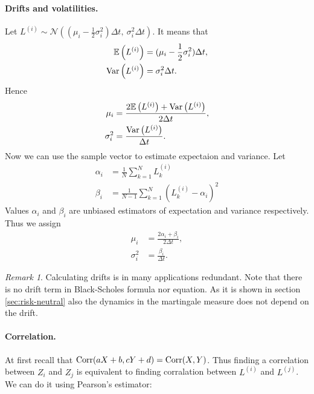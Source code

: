 \documentclass[a4paper,12pt, oneside]{book}
\theoremstyle{definition}
\theoremstyle{remark}
\newtheorem{remark}{Remark}[chapter]
\def\Var{{\rm Var}}
\def\E{{\mathbb{E}}}
\def\Corr{{\hbox{Corr}}}
\begin{document}
\paragraph{Drifts and volatilities.}
Let $L^{(i)} \sim \mathcal{N}\left(  (\mu_i - \frac{1}{2}\sigma_i^2)\Delta t,\ \sigma_i^2 \Delta t \right)$. It means that
\begin{equation*}
 \begin{split}
  \E\left( L^{(i)} \right) &= (\mu_i - \frac{1}{2}\sigma_i^2)\Delta t, \\
  \Var\left( L^{(i)} \right) &= \sigma_i^2 \Delta t.
 \end{split}
\end{equation*}
Hence
\begin{equation*}
 \begin{split}
  \mu_i  &= \frac{ 2\E\left( L^{(i)} \right) + \Var\left( L^{(i)} \right) }{2\Delta t}, \\
  \sigma_i^2 &= \frac{\Var\left( L^{(i)} \right)}{\Delta t}.
 \end{split}
\end{equation*}
Now we can use the sample vector to estimate expectaion and variance. Let
\begin{equation*}
 \begin{split}
  \alpha_i &= \frac{1}{N}\sum\limits_{k=1}^{N} L^{(i)}_k\\
  \beta_i &= \frac{1}{N-1}\sum\limits_{k=1}^{N}(L^{(i)}_k - \alpha_i)^2
 \end{split}
\end{equation*}
Values $\alpha_i$ and $\beta_i$ are unbiased estimators of expectation and variance respectively. Thus we assign
\begin{equation*}
 \begin{split}
  \mu_i  &= \frac{ 2\alpha_i + \beta_i }{2\Delta t}, \\
  \sigma_i^2 &= \frac{\beta_i}{\Delta t}.
 \end{split}
\end{equation*}
\begin{remark}
 Calculating drifts is in many applications redundant. Note that there is no drift term in Black-Scholes formula nor equation. As it is shown in section \ref{sec:risk-neutral} also the dynamics in the martingale measure does not depend on the drift.
\end{remark}


\paragraph{Correlation.} At first recall that $\Corr(aX + b, cY + d) = \Corr(X,Y)$. Thus finding a correlation between $Z_i$ and $Z_j$ is equivalent to finding corralation between $L^{(i)}$ and $L^{(j)}$. We can do it using Pearson's estimator:
\end{document}
